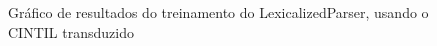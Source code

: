 \begin{figure}[!ht]
    \centering
    
    \caption[Gráfico de resultados do treinamento, usando o CINTIL transduzido]{Gráfico de resultados do treinamento do LexicalizedParser, usando o CINTIL transduzido}
    \label{fig:treino_cintil}
\end{figure}